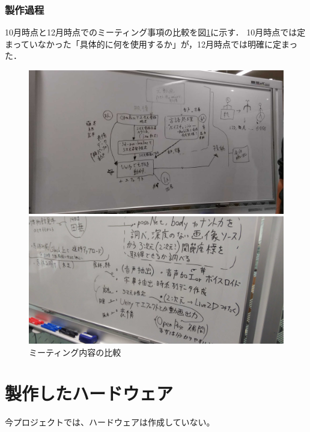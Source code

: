 \documentclass[a4paper,12pt]{jsarticle}
\begin{document}
\subsubsection{製作過程}
10月時点と12月時点でのミーティング事項の比較を図\ref{fig:iw132compare}に示す．
10月時点では定まっていなかった「具体的に何を使用するか」が，12月時点では明確に定まった．

\begin{figure}[h]
  \centering
 \begin{minipage}[b]{0.45\linewidth}
  \centering
  \includegraphics[width=1.0\textwidth]{fig/iw1321.png}
  \end{minipage}
 \begin{minipage}[b]{0.08\linewidth}
  \centering
 \end{minipage}
 \begin{minipage}[b]{0.45\linewidth}
  \centering
  \includegraphics[width=1.0\textwidth]{fig/iw1322.png}
  \end{minipage}
 \caption{ミーティング内容の比較}
 \label{fig:iw132compare}
\end{figure}

\section{製作したハードウェア}
今プロジェクトでは、ハードウェアは作成していない。
\end{document}
